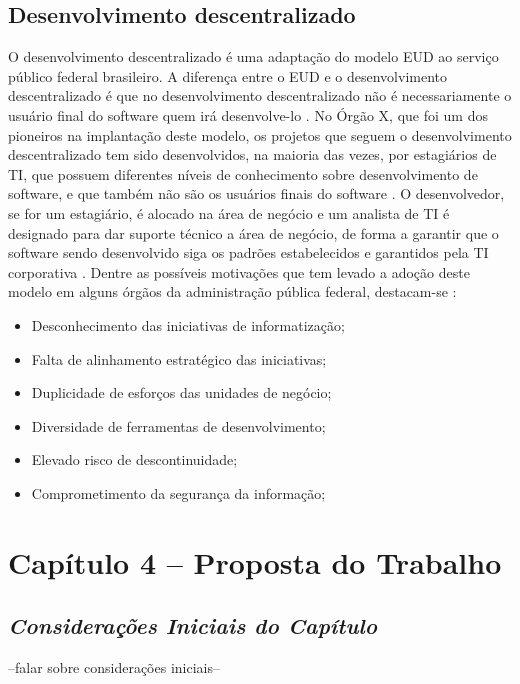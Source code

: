 \section{Desenvolvimento descentralizado}

O desenvolvimento descentralizado é uma adaptação do modelo EUD ao serviço público federal brasileiro. A diferença entre o EUD e o desenvolvimento descentralizado é que no desenvolvimento descentralizado não é necessariamente o usuário final do software quem irá desenvolve-lo \cite{artigoTcuGovTI}. No Órgão X, que foi um dos pioneiros na implantação deste modelo, os projetos que seguem o desenvolvimento descentralizado tem sido desenvolvidos, na maioria das vezes, por estagiários de TI, que possuem diferentes níveis de conhecimento sobre desenvolvimento de software, e que também não são os usuários finais do software \cite{artigoTcuGovTI}. O desenvolvedor, se for um estagiário, é alocado na área de negócio e um analista de TI é designado para dar suporte técnico a área de negócio, de forma a garantir que o software sendo desenvolvido siga os padrões estabelecidos e garantidos pela TI corporativa \cite{artigoTcuGovTI}.
Dentre as possíveis motivações que tem levado a adoção deste modelo em alguns órgãos da administração pública federal, destacam-se \cite{slideTCU}:

\begin{itemize}
\item Desconhecimento das iniciativas de informatização;
\item Falta de alinhamento estratégico das iniciativas;
\item Duplicidade de esforços das unidades de negócio;
\item Diversidade de ferramentas de desenvolvimento;
\item Elevado risco de descontinuidade;
\item Comprometimento da segurança da informação;
\end{itemize}

\chapter[Capítulo 4]{Capítulo 4 – Proposta do Trabalho}

\section{\textit{Considerações Iniciais do Capítulo}}

--falar sobre considerações iniciais--

